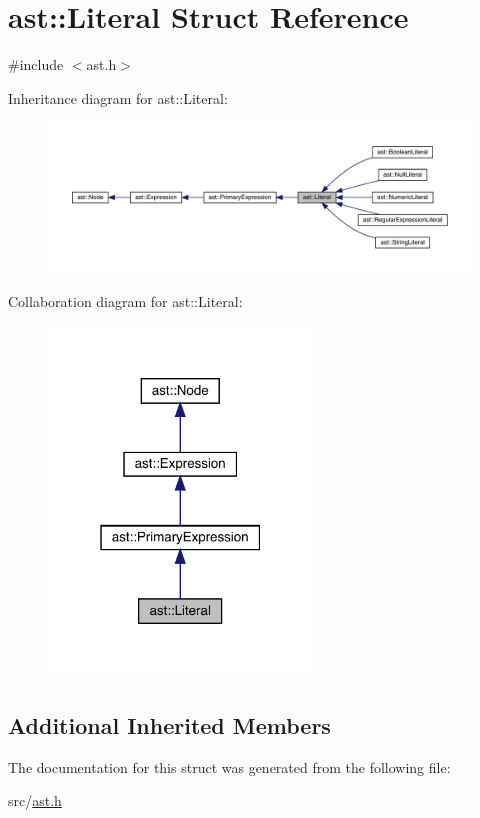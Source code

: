 \hypertarget{structast_1_1_literal}{}\section{ast\+:\+:Literal Struct Reference}
\label{structast_1_1_literal}


{\ttfamily \#include $<$ast.\+h$>$}



Inheritance diagram for ast\+:\+:Literal\+:
\nopagebreak
\begin{figure}[H]
\begin{center}
\leavevmode
\includegraphics[width=350pt]{structast_1_1_literal__inherit__graph}
\end{center}
\end{figure}


Collaboration diagram for ast\+:\+:Literal\+:
\nopagebreak
\begin{figure}[H]
\begin{center}
\leavevmode
\includegraphics[width=199pt]{structast_1_1_literal__coll__graph}
\end{center}
\end{figure}
\subsection*{Additional Inherited Members}


The documentation for this struct was generated from the following file\+:\begin{DoxyCompactItemize}
\item 
src/\hyperlink{ast_8h}{ast.\+h}\end{DoxyCompactItemize}
